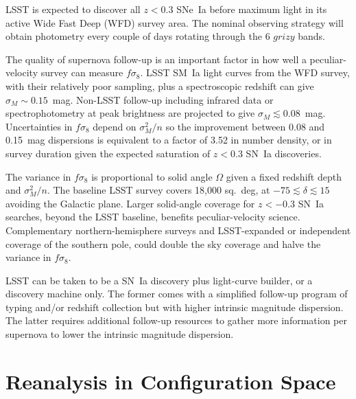 \documentclass{aastex62}   	%
\begin{document}
LSST is expected to discover all $z<0.3$ SNe~Ia before maximum light in its active Wide Fast Deep (WFD) survey area.
The nominal observing strategy will obtain photometry every couple of days rotating through the 6 $grizy$ bands.

The quality of supernova follow-up is an important factor in how well a peculiar-velocity survey can measure $f\sigma_8$.
LSST SM~Ia light curves from the WFD survey, with their relatively poor sampling, plus a spectroscopic redshift
 can give $\sigma_M \sim 0.15$~mag. Non-LSST follow-up including infrared data \citep{2012MNRAS.425.1007B} or spectrophotometry at peak brightness
 \citep{2015ApJ...815...58F} are projected to give
$\sigma_M \lesssim 0.08$~mag.
Uncertainties in $f\sigma_8$ depend on $\sigma^2_M/n$ so the improvement between 0.08 and 0.15~mag dispersions is equivalent to a factor of 3.52
 in number density, or in survey duration given the expected saturation of $z<0.3$ SN~Ia discoveries.

The variance in $f\sigma_8$ is proportional to solid angle $\Omega$ given a fixed redshift depth and  $\sigma^2_M/n$.  The baseline
LSST survey covers 18,000 sq.~deg, at $-75 \lesssim \delta \lesssim15$ avoiding the Galactic plane.  Larger solid-angle coverage for $z<-0.3$ SN~Ia searches, beyond
the LSST baseline, benefits peculiar-velocity science.  Complementary northern-hemisphere surveys and LSST-expanded or independent
coverage of the southern pole, could double
the sky coverage and halve the variance in $f\sigma_8$.

LSST can be taken to be a SN~Ia discovery plus light-curve builder, or a discovery machine only.  The former comes with a simplified follow-up program of typing
and/or redshift collection but with higher intrinsic magnitude dispersion.  The latter requires additional follow-up resources to gather more information per supernova to
lower the intrinsic magnitude dispersion.

\appendix
\section{Reanalysis in Configuration Space}
\end{document}
